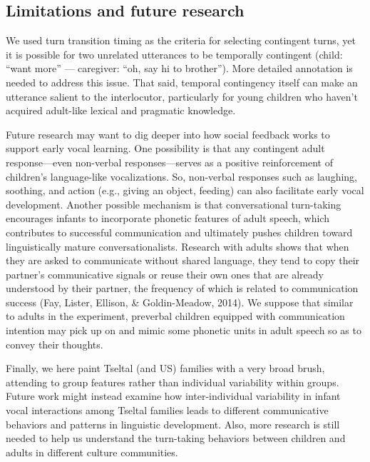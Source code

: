 \documentclass[
  man]{apa6}
\begin{document}
\hypertarget{limitations-and-future-research}{%
\subsection{Limitations and future research}\label{limitations-and-future-research}}

We used turn transition timing as the criteria for selecting contingent turns, yet it is possible for two unrelated utterances to be temporally contingent (child: ``want more'' --- caregiver: ``oh, say hi to brother''). More detailed annotation is needed to address this issue. That said, temporal contingency itself can make an utterance salient to the interlocutor, particularly for young children who haven't acquired adult-like lexical and pragmatic knowledge.

Future research may want to dig deeper into how social feedback works to support early vocal learning. One possibility is that any contingent adult response---even non-verbal responses---serves as a positive reinforcement of children's language-like vocalizations. So, non-verbal responses such as laughing, soothing, and action (e.g., giving an object, feeding) can also facilitate early vocal development. Another possible mechanism is that conversational turn-taking encourages infants to incorporate phonetic features of adult speech, which contributes to successful communication and ultimately pushes children toward linguistically mature conversationalists. Research with adults shows that when they are asked to communicate without shared language, they tend to copy their partner's communicative signals or reuse their own ones that are already understood by their partner, the frequency of which is related to communication success (Fay, Lister, Ellison, \& Goldin-Meadow, 2014). We suppose that similar to adults in the experiment, preverbal children equipped with communication intention may pick up on and mimic some phonetic units in adult speech so as to convey their thoughts.

Finally, we here paint Tseltal (and US) families with a very broad brush, attending to group features rather than individual variability within groups. Future work might instead examine how inter-individual variability in infant vocal interactions among Tseltal families leads to different communicative behaviors and patterns in linguistic development. Also, more research is still needed to help us understand the turn-taking behaviors between children and adults in different culture communities.
\end{document}
